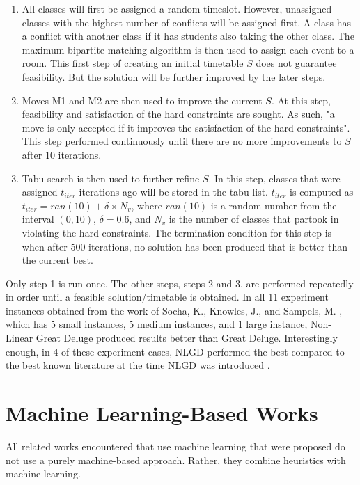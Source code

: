 \begin{enumerate}
	\item All classes will first be assigned a random timeslot. However, unassigned classes with the highest number of conflicts will be assigned first. A class has a conflict with another class if it has students also taking the other class. The maximum bipartite matching algorithm \cite{maximum-bipartite-matching} is then used to assign each event to a room. This first step of creating an initial timetable $S$ does not guarantee feasibility. But the solution will be further improved by the later steps.
	\item Moves M1 and M2 are then used to improve the current $S$. At this step, feasibility and satisfaction of the hard constraints are sought. As such, "a move is only accepted if it improves the satisfaction of the hard constraints". This step performed continuously until there are no more improvements to $S$ after 10 iterations.
	\item Tabu search \cite{brownlee-tabu-search} is then used to further refine $S$. In this step, classes that were assigned $t_{iter}$ iterations ago will be stored in the tabu list. $t_{iter}$ is computed as $t_{iter} = ran(10) + \delta \times N_{v}$, where $ran(10)$ is a random number from the interval $(0, 10)$, $\delta = 0.6$, and $N_{v}$ is the number of classes that partook in violating the hard constraints. The termination condition for this step is when after 500 iterations, no solution has been produced that is better than the current best.
\end{enumerate}

Only step 1 is run once. The other steps, steps 2 and 3, are performed repeatedly in order until a feasible solution/timetable is obtained. In all 11 experiment instances obtained from the work of Socha, K., Knowles, J., and Sampels, M. \cite{socha-maxmin-ant-system}, which has 5 small instances, 5 medium instances, and 1 large instance, Non-Linear Great Deluge produced results better than Great Deluge. Interestingly enough, in 4 of these experiment cases, NLGD performed the best compared to the best known literature at the time NLGD was introduced \cite{nlgd-landa-silva}.

\section{Machine Learning-Based Works}
All related works encountered that use machine learning that were proposed do not use a purely machine-based approach. Rather, they combine heuristics with machine learning.

